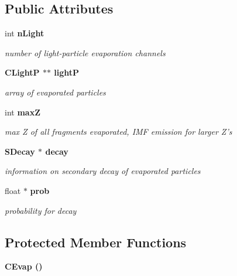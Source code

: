 \subsection*{Public Attributes}
\begin{CompactItemize}
\item 
int \bf{n\-Light}\label{classCEvap_d9d4d37aa62cf72432bcf71e8f35b7c7}

\begin{CompactList}\small\item\em number of light-particle evaporation channels \item\end{CompactList}\item 
\bf{CLight\-P} $\ast$$\ast$ \bf{light\-P}\label{classCEvap_ef12731853c39ee996ed8f33aa3208ad}

\begin{CompactList}\small\item\em array of evaporated particles \item\end{CompactList}\item 
int \bf{max\-Z}\label{classCEvap_0a69feb1d6e867e57a11a8dd952fe855}

\begin{CompactList}\small\item\em max Z of all fragments evaporated, IMF emission for larger Z's \item\end{CompactList}\item 
\bf{SDecay} $\ast$ \bf{decay}\label{classCEvap_7dc33089f4a45d0fb33f53b82af1d430}

\begin{CompactList}\small\item\em information on secondary decay of evaporated particles \item\end{CompactList}\item 
float $\ast$ \bf{prob}\label{classCEvap_8d5f62d335f958c5ea80546e3c8fce77}

\begin{CompactList}\small\item\em probability for decay \item\end{CompactList}\end{CompactItemize}
\subsection*{Protected Member Functions}
\begin{CompactItemize}
\item 
\bf{CEvap} ()
\end{CompactItemize}
